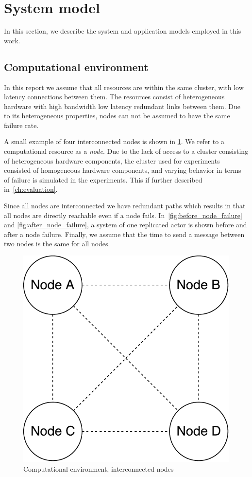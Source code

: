 \documentclass{cslthse-msc}
\begin{document}
\section{System model} \label{sec:design_system_model}
In this section, we describe the system and application models employed in this work.

\subsection{Computational environment} \label{subsec:design_comp_env}
In this report we assume that all resources are within the same cluster, with low latency connections between them. The resources consist of heterogeneous hardware with high bandwidth low latency redundant links between them. Due to its heterogeneous properties, nodes can not be assumed to have the same failure rate.

A small example of four interconnected nodes is shown in \cref{fig:computational_environment}. We refer to a computational resource as a \emph{node}. Due to the lack of access to a cluster consisting of heterogeneous hardware components, the cluster used for experiments consisted of homogeneous hardware components, and varying behavior in terms of failure is simulated in the experiments. This if further described in~\cref{ch:evaluation}.

Since all nodes are interconnected we have redundant paths which results in that all nodes are directly reachable even if a node fails. In~\cref{fig:before_node_failure} and \cref{fig:after_node_failure}, a system of one replicated actor is shown before and after a node failure. Finally, we assume that the time to send a message between two nodes is the same for all nodes.

\begin{figure}[!hbt]
\centering
\includegraphics[scale=0.5]{images/computational_environment.pdf}
\caption{Computational environment, interconnected nodes} \label{fig:computational_environment}
\end{figure}
\end{document}
